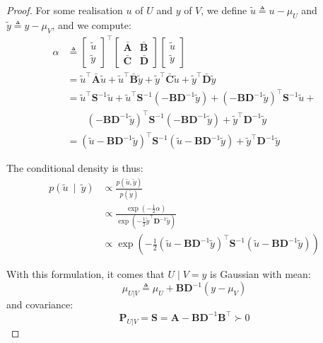\begin{proof}
	For some realisation $u$ of $U$ and $y$ of $V$, we define $\tilde{u}\triangleq u-\mu_U$ and $\tilde{y}\triangleq y-\mu_V$, and we compute:
	\begin{equation}
		\begin{aligned}
		\alpha&\triangleq\begin{bmatrix}\tilde{u}\\\tilde{y}\end{bmatrix}^\top\begin{bmatrix}\bar{\mathbf{A}}&\bar{\mathbf{B}}\\\bar{\mathbf{C}}&\bar{\mathbf{D}}\end{bmatrix}\begin{bmatrix}\tilde{u}\\\tilde{y}\end{bmatrix}\\
		&=\tilde{u}^\top\bar{\mathbf{A}}\tilde{u}+\tilde{u}^\top\bar{\mathbf{B}}\tilde{y}+\tilde{y}^\top\bar{\mathbf{C}}\tilde{u}+\tilde{y}^\top\bar{\mathbf{D}}\tilde{y}\\
		&=\tilde{u}^\top \mathbf{S}^{-1}\tilde{u}+\tilde{u}^\top \mathbf{S}^{-1}\left(-\mathbf{B}\mathbf{D}^{-1}\tilde{y}\right)+\left(-\mathbf{B}\mathbf{D}^{-1}\tilde{y}\right)^\top \mathbf{S}^{-1}\tilde{u}+\\
		&\qquad\left(-\mathbf{B}\mathbf{D}^{-1}\tilde{y}\right)^\top \mathbf{S}^{-1}\left(-\mathbf{B}\mathbf{D}^{-1}\tilde{y}\right)+\tilde{y}^\top \mathbf{D}^{-1}\tilde{y}\\
		&=(\tilde{u}-\mathbf{B}\mathbf{D}^{-1}\tilde{y})^\top \mathbf{S}^{-1}(\tilde{u}-\mathbf{B}\mathbf{D}^{-1}\tilde{y})+\tilde{y}^\top \mathbf{D}^{-1}\tilde{y}
		\end{aligned}
	\end{equation}

	The conditional density is thus:
	\begin{equation}
		\begin{aligned}
		p\left(\tilde{u}\:\middle|\:\tilde{y}\right)&\propto\frac{\displaystyle p\left(\tilde{u},\tilde{y}\right)}{\displaystyle p\left(\tilde{y}\right)}\\
		&\propto\frac{\displaystyle\exp\left(-\frac{1}{2}\alpha\right)}{\displaystyle\exp\left(-\frac{1}{2}\tilde{y}^\top \mathbf{D}^{-1}\tilde{y}\right)}\\
		&\propto\exp\left(-\frac{1}{2}(\tilde{u}-\mathbf{B}\mathbf{D}^{-1}\tilde{y})^\top \mathbf{S}^{-1}(\tilde{u}-\mathbf{B}\mathbf{D}^{-1}\tilde{y})\right)
		\end{aligned}
	\end{equation}

	With this formulation, it comes that $U\mid V=y$ is Gaussian with mean:
	\begin{equation}
		\mu_{U|V}\triangleq\mu_U+\mathbf{B}\mathbf{D}^{-1}\left(y-\mu_V\right)
	\end{equation}
	and covariance:
	\begin{equation}
		\mathbf{P}_{U|V}=\mathbf{S}=\mathbf{A}-\mathbf{B}\mathbf{D}^{-1}\mathbf{B}^\top\succ0
	\end{equation}
\end{proof}

